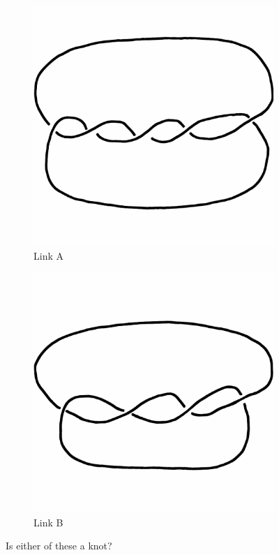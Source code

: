 \documentclass[12pt,letterpaper]{article}
\theoremstyle{definition}
\begin{document}
\begin{figure}[h]
     \centering
        \begin{subfigure}{.45\textwidth}
        \centering
        \includegraphics[width=\textwidth]{knotpics/twistknot.png}
        \caption{Link A}
    \end{subfigure}
    \quad
    \begin{subfigure}{.45\textwidth}
        \centering
        \includegraphics[width=\textwidth]{knotpics/twistlink.png}
        \caption{Link B}
    \end{subfigure}
    \caption{Is either of these a knot?}
\end{figure}
\end{document}
